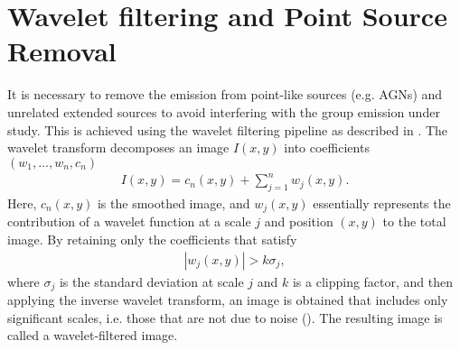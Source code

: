 \section{Wavelet filtering and Point Source Removal}
It is necessary to remove the emission from point-like sources (e.g. AGNs) and unrelated extended sources to avoid interfering with the group emission under study. This is achieved using the wavelet filtering pipeline as described in \citet{Pacaud2006}. The wavelet transform decomposes an image \(I(x, y)\) into coefficients \((w_1, \ldots, w_n, c_n)\)
\begin{align*}
I(x, y) = c_n(x, y) + \sum_{j=1}^{n}w_j(x, y).    
\end{align*}
Here, \(c_n(x, y)\) is the smoothed image, and \(w_j(x, y)\) essentially represents the contribution of a wavelet function at a scale \(j\) and position \((x, y)\) to the total image. By retaining only the coefficients that satisfy
\begin{align*}
|w_j(x, y)| > k\sigma_j,
\end{align*}
where \(\sigma_j\) is the standard deviation at scale \(j\) and \(k\) is a clipping factor, and then applying the inverse wavelet transform, an image is obtained that includes only significant scales, i.e. those that are not due to noise (\cite{Stark1998}). The resulting image is called a wavelet-filtered image. 

